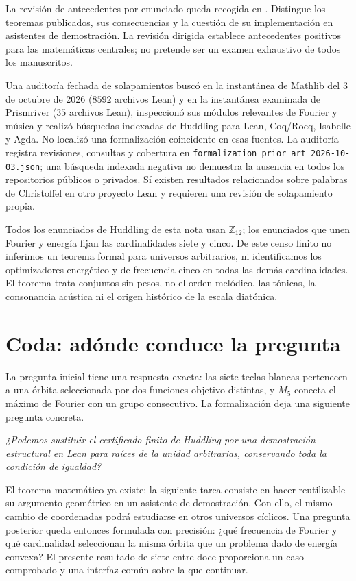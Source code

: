 \documentclass[11pt]{article}
\newcommand{\lean}[1]{\texttt{#1}}
\newcommand{\Ztwelve}{\mathbb{Z}_{12}}
\newcommand{\question}[1]{\smallskip\noindent\textit{#1}\smallskip}
\begin{document}
La revisión de antecedentes por enunciado queda recogida en
. Distingue los teoremas publicados, sus
consecuencias y la cuestión de su implementación en asistentes de demostración. La
revisión dirigida establece antecedentes positivos para las matemáticas centrales;
no pretende ser un examen exhaustivo de todos los manuscritos.

Una auditoría fechada de solapamientos buscó en la instantánea de Mathlib del 3 de
octubre de 2026 ($8592$ archivos Lean) y en la instantánea examinada de Prismriver
($35$ archivos Lean), inspeccionó sus módulos relevantes de Fourier y música y realizó
búsquedas indexadas de Huddling para Lean, Coq/Rocq, Isabelle y Agda. No localizó una
formalización coincidente en esas fuentes. La auditoría registra revisiones, consultas
y cobertura en \lean{formalization\_prior\_art\_2026-10-03.json}; una búsqueda indexada
negativa no demuestra la ausencia en todos los repositorios públicos o privados.
Sí existen resultados relacionados sobre palabras de Christoffel en otro proyecto
Lean y requieren una revisión de solapamiento propia.

Todos los enunciados de Huddling de esta nota usan $\Ztwelve$; los enunciados que unen
Fourier y energía fijan las cardinalidades siete y cinco. De este censo finito no
inferimos un teorema formal para universos arbitrarios, ni identificamos los
optimizadores energético y de frecuencia cinco en todas las demás cardinalidades.
El teorema trata conjuntos sin pesos, no el orden melódico, las tónicas, la consonancia
acústica ni el origen histórico de la escala diatónica.

\section*{Coda: adónde conduce la pregunta}

La pregunta inicial tiene una respuesta exacta: las siete teclas blancas pertenecen
a una órbita seleccionada por dos funciones objetivo distintas, y $M_5$ conecta el
máximo de Fourier con un grupo consecutivo. La formalización deja una siguiente
pregunta concreta.

\question{¿Podemos sustituir el certificado finito de Huddling por una demostración
estructural en Lean para raíces de la unidad arbitrarias, conservando toda la condición de igualdad?}

El teorema matemático ya existe; la siguiente tarea consiste en hacer reutilizable su
argumento geométrico en un asistente de demostración. Con ello, el mismo cambio de
coordenadas podrá estudiarse en otros universos cíclicos. Una pregunta posterior queda
entonces formulada con precisión: ¿qué frecuencia de Fourier y qué cardinalidad
seleccionan la misma órbita que un problema dado de energía convexa? El presente
resultado de siete entre doce proporciona un caso comprobado y una interfaz común
sobre la que continuar.
\end{document}
